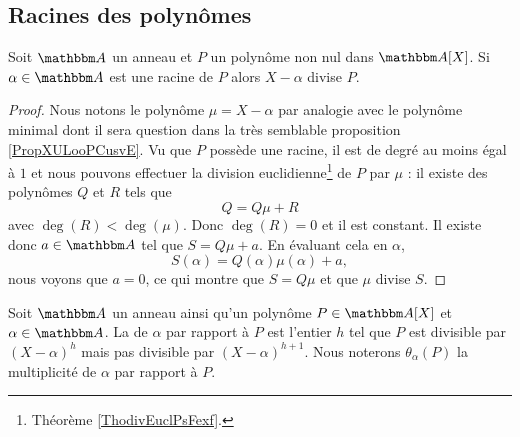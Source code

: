 \subsection{Racines des polynômes}
\begin{proposition} \label{PropHSQooASRbeA}
    Soit \( \eA\) un anneau et \( P\) un polynôme non nul dans \( \eA[X]\). Si \( \alpha\in \eA\) est une racine de \( P\) alors \( X-\alpha\) divise \( P\).
\end{proposition}

\begin{proof}
    Nous notons le polynôme \( \mu=X-\alpha\) par analogie avec le polynôme minimal dont il sera question dans la très semblable proposition \ref{PropXULooPCusvE}. 
    Vu que \( P\) possède une racine, il est de degré au moins égal à \( 1\) et nous pouvons effectuer la division euclidienne\footnote{Théorème \ref{ThodivEuclPsFexf}.} de \( P\) par \( \mu\) : il existe des polynômes \( Q\) et \( R\) tels que
    \begin{equation}
        Q=Q\mu+R
    \end{equation}
    avec \( \deg(R)<\deg(\mu)\). Donc \( \deg(R)=0\) et il est constant. Il existe donc \( a\in \eA\) tel que \( S=Q\mu+a\). En évaluant cela en \( \alpha\),
    \begin{equation}
        S(\alpha)=Q(\alpha)\mu(\alpha)+a,
    \end{equation}
    nous voyons que \( a=0\), ce qui montre que \( S=Q\mu\) et que \( \mu\) divise \( S\).
\end{proof}

\begin{definition}
    Soit \( \eA\) un anneau ainsi qu'un polynôme \( P\in \eA[X]\) et \( \alpha\in \eA\). La  de \( \alpha\) par rapport à \( P\) est l'entier \( h\) tel que \( P\) est divisible par \( (X-\alpha)^h\) mais pas divisible par \( (X-\alpha)^{h+1}\).  Nous noterons \( \theta_{\alpha}(P)\) la multiplicité de \( \alpha\) par rapport à \( P\).
\end{definition}

